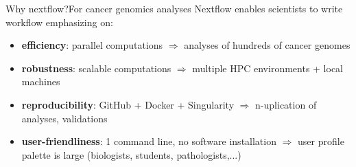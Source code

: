 \documentclass[xcolor=table,compress]{beamer} %
\begin{document}
\begin{frame}{Why nextflow?}{For cancer genomics analyses}
Nextflow enables scientists to write workflow emphasizing on:
\begin{itemize}
	\item \textbf{efficiency}: parallel computations $\Rightarrow$ analyses of hundreds of cancer genomes \pause
	\item \textbf{robustness}: scalable computations $\Rightarrow$ multiple HPC environments + local machines \pause
	\item \textbf{reproducibility}: GitHub + Docker + Singularity $\Rightarrow$ n-uplication of analyses, validations \pause
	\item \textbf{user-friendliness}: 1 command line, no software installation $\Rightarrow$ user profile palette is large (biologists, students, pathologists,...)
\end{itemize}
\end{frame}
\end{document}
